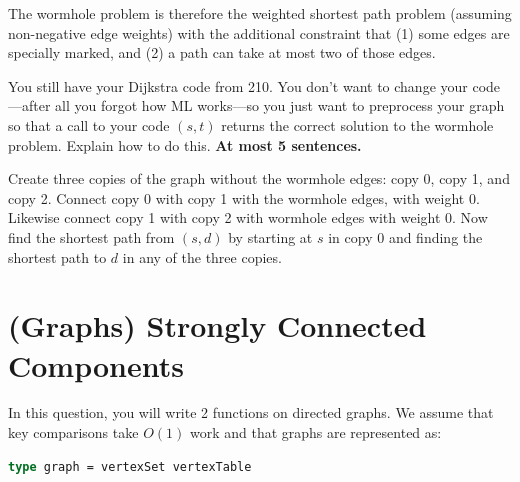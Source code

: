 \begin{problem}
The wormhole problem is therefore the weighted shortest path problem
(assuming non-negative edge weights) with the additional constraint
that (1) some edges are specially marked, and (2) a path can take at
most two of those edges.

\ask
You still have your Dijkstra code from 210.  You don't want to change
your code---after all you forgot how ML works---so you just want to
preprocess your graph so that a call to your code $(s,t)$
returns the correct solution to the wormhole problem.  Explain how to
do this. \textbf{At most 5 sentences.}

\sol
Create three copies of the graph without the wormhole edges: copy 0,
copy 1, and copy 2.  Connect copy 0 with copy 1 with the wormhole
edges, with weight 0.  Likewise connect copy 1 with copy 2 with
wormhole edges with weight 0.  Now find the shortest path from
$(s,d)$ by starting at $s$ in copy 0 and finding the shortest
path to $d$ in any of the three copies.
\end{problem}





%

\section{(Graphs) Strongly Connected Components}


In this question, you will write 2 functions on directed graphs.
We assume that key comparisons take $O(1)$ work  and  that graphs are represented as:
\begin{lstlisting}[language=ocaml, numbers=none]
type graph = vertexSet vertexTable
\end{lstlisting}


